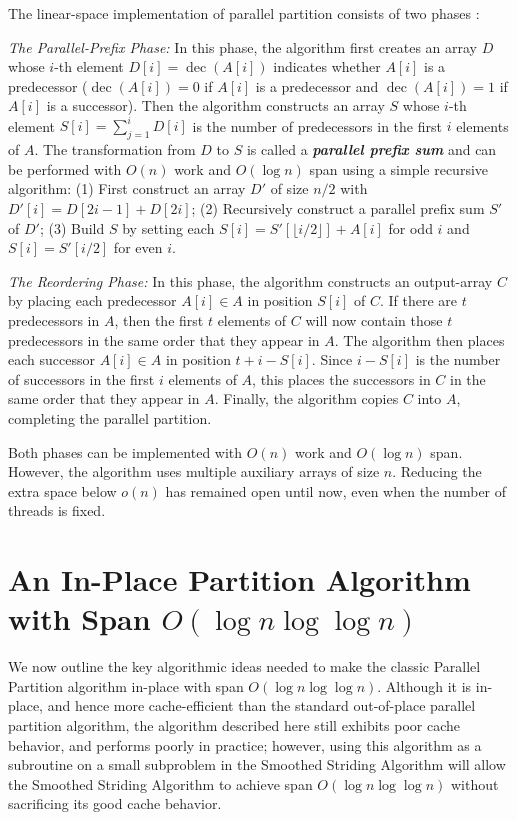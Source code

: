 \documentclass[sigconf, 10pt, nonacm]{acmart}
\newcommand{\dec}{\operatorname{dec}}
\newcommand{\defn}[1]{{\textit{\textbf{\boldmath #1}}}}
\renewcommand{\paragraph}[1]{\vspace{0.09in}\noindent{\bf \boldmath #1.}}
\theoremstyle{remark}
\theoremstyle{remark}
\begin{document}
\paragraph{The (Standard) Linear-Space Parallel Partition} The linear-space
implementation of parallel partition consists of two phases
\cite{Blelloch96,AcarBl16}:

\noindent\emph{The Parallel-Prefix Phase: }In this phase, the algorithm first
creates an array $D$ whose $i$-th element $D[i] = \dec(A[i])$ indicates whether
$A[i]$ is a predecessor ($\dec(A[i])=0$ if $A[i]$ is a predecessor and
$\dec(A[i]) = 1$ if $A[i]$ is a successor). Then the
algorithm constructs an array $S$ whose $i$-th element $S[i] = \sum_{j = 1}^i
D[i]$ is the number of predecessors in the first $i$ elements of $A$. The
transformation from $D$ to $S$ is called a \defn{parallel prefix sum} and can
be performed with $O(n)$ work and $O(\log n)$ span using a simple recursive
algorithm: (1) First construct an array $D'$ of size $n / 2$ with $D'[i] = D[2i
- 1] + D[2i]$; (2) Recursively construct a parallel prefix sum $S'$ of $D'$;
(3) Build $S$ by setting each $S[i] = S'[\lfloor i / 2 \rfloor] + A[i]$ for odd
$i$ and $S[i] = S'[i / 2]$ for even $i$. 

\noindent\emph{The Reordering Phase: }In this phase, the algorithm constructs
an output-array $C$ by placing each predecessor $A[i] \in A$ in position $S[i]$
of $C$. If there are $t$ predecessors in $A$, then the first $t$ elements of
$C$ will now contain those $t$ predecessors in the same order that they appear
in $A$. The algorithm then places each successor $A[i] \in A$ in position $t +
i - S[i]$. Since $i - S[i]$ is the number of successors in the first $i$
elements of $A$, this places the successors in $C$ in the same order that they
appear in $A$. Finally, the algorithm copies $C$ into $A$, completing the
parallel partition.

Both phases can be implemented with $O(n)$ work and $O(\log n)$
span. However, the algorithm uses multiple auxiliary arrays of size $n$.
Reducing the extra space below $o(n)$ has remained open until now, even when
the number of threads is fixed.

\section{An In-Place Partition Algorithm \\with Span $O(\log n \log \log
n)$}\label{sec:prefixbasedalg} We now outline the key algorithmic ideas needed
to make the classic Parallel Partition algorithm in-place with span $O(\log n
\log \log n)$. Although it is in-place, and hence more cache-efficient than the
standard out-of-place parallel partition algorithm, the algorithm described
here still exhibits poor cache behavior, and performs poorly in practice;
however, using this algorithm as a subroutine on a small subproblem in the
Smoothed Striding Algorithm will allow the Smoothed Striding Algorithm to
achieve span $O(\log n \log \log n)$ without sacrificing its good cache behavior.
\end{document}
